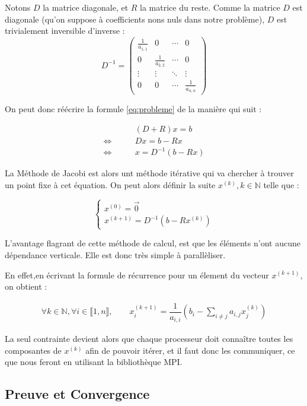 \documentclass[11pt, a4paper]{article}
\begin{document}
Notons $D$ la matrice diagonale, et $R$ la matrice du reste.
Comme la matrice $D$ est diagonale (qu'on suppose à coefficients nons nuls dans notre problème), $D$ est trivialement inversible d'inverse : \\

\[
D^{-1} =
  \begin{pmatrix}
  \frac{1}{a_{1,1}} & 0 & \cdots & 0 \\
  0 & \frac{1}{a_{2,2}} & \cdots & 0 \\
  \vdots  & \vdots  & \ddots & \vdots  \\
  0 & 0 & \cdots & \frac{1}{a_{n,n}}
 \end{pmatrix}
\]

On peut donc réécrire la formule \eqref{eq:probleme} de la manière qui suit :

\begin{align}
& (D + R)x = b\\
\Leftrightarrow \qquad & Dx = b - Rx \\
\Leftrightarrow \qquad & x = D^{-1}(b - Rx)
\end{align}

La Méthode de Jacobi est alors unt méthode itérative qui va chercher à trouver un point fixe à cet équation. On peut alors définir la suite $x^{(k)}, k \in \mathbb{N}$ telle que :

\[
    \left\{
    \begin{array}{l}
        x^{(0)} = \vec{0}\\
        x^{(k+1)} = D^{-1}( b - Rx^{(k)})
    \end{array}
    \right.
\]

L'avantage flagrant de cette méthode de calcul, est que les éléments n'ont aucune dépendance verticale. Elle est donc très simple à parallèliser. 

En effet,en écrivant la formule de récurrence pour un élement du vecteur $x^{(k+1)}$, on obtient :

\begin{align}
    \forall k \in \mathbb{N}, \forall i \in \llbracket 1,n \rrbracket, 
    \qquad x_{i}^{(k+1)} = \dfrac{1}{a_{i,i}}(b_i - \sum_{i \neq j}a_{i,j} x^{(k)}_j)
\end{align}

La seul contrainte devient alors que chaque processeur doit conna\^itre toutes les composantes de $x^{(k)}$ afin de pouvoir itérer, et il faut donc les communiquer, ce que nous feront en utilisant la bibliothèque MPI.

\subsection{Preuve et Convergence}
\end{document}
